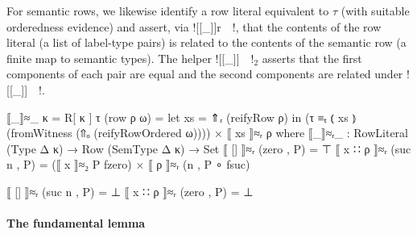 \begin{AgdaAlign}
For semantic rows, we likewise identify a row literal equivalent to $\tau$ (with suitable orderedness evidence) and assert, via ![[_]]r~~!, that the contents of the row literal (a list of label-type pairs) is related to the contents of the semantic row (a finite map to semantic types). The helper ![[_]]~~!$_2$ asserts that the first components of each pair are equal and the second components are related under ![[_]]~~!.

\begin{code}
  ⟦_⟧≈_ {κ = R[ κ ]} τ (row ρ ω) =
    let xs = ⇑ᵣ (reifyRow ρ) in 
    (τ ≡ₜ ⦅ xs ⦆ (fromWitness (⇑ₒ (reifyRowOrdered ω)))) 
    × ⟦ xs ⟧≈ᵣ ρ
    where 
      ⟦_⟧≈ᵣ_ : RowLiteral (Type Δ κ) → 
               Row (SemType Δ κ) → Set
      ⟦ [] ⟧≈ᵣ (zero , P) = ⊤
      ⟦ x ∷ ρ ⟧≈ᵣ (suc n , P) = 
        (⟦ x ⟧≈₂ P fzero) × ⟦ ρ ⟧≈ᵣ (n , P ∘ fsuc)
\end{code}
\begin{code}[hide]
      ⟦ [] ⟧≈ᵣ (suc n , P) = ⊥
      ⟦ x ∷ ρ ⟧≈ᵣ (zero , P) = ⊥
\end{code}
\end{AgdaAlign}

\paragraph{The fundamental lemma}

